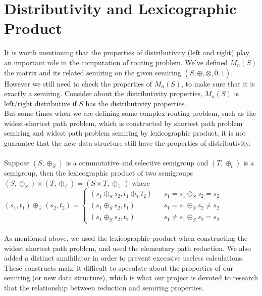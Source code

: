 \documentclass[a4paper,12pt,twoside,openright]{report}
\begin{document}
\section{Distributivity and Lexicographic Product}
It is worth mentioning that the properties of distributivity (left and right) play an important role in the computation of routing problem.
We've defined $M_n(S)$ the matrix and its related semiring on the given semiring $(S,\oplus,\otimes,\bar0,\bar1)$.
However we still need to check the properties of $M_n(S)$, to make sure that it is exactly a semiring.
Consider about the distributivity properties, $M_n(S)$ is left/right distributive if $S$ has the distributivity properties.\\
But some times when we are defining some complex routing problem, such as the widest-shortest path problem, which is constructed by shortest path problem semiring and widest path problem semiring by lexicographic product, it is not guarantee that the new data structure still have the properties of distributivity.\\\\
Suppose $(S,\oplus_S)$ is a commutative and selective semigroup and $(T,\oplus_t)$ is a semigroup, then the lexicographic product of two semigroups $(S,\oplus_S) \bar{\times} (T,\oplus_T) = (S\times T, \oplus_{\bar{\times}})$ where\\
$(s_1,t_1) \oplus_{\bar{\times}} (s_2,t_2)=\left\{
\begin{array}{rcl}
(s_1\oplus_S s_2,t_1\oplus_T t_2)      &      & { s_1 = s_1 \oplus_S s_2 = s_2}\\
(s_1\oplus_S s_2,t_1)       &      & {s_1 = s_1 \oplus_S s_2 \neq s_2}\\
(s_1\oplus_S s_2,t_2)       &      & {s_1 \neq s_1 \oplus_S s_2 = s_2}
\end{array} \right.$\\\\

As mentioned above, we used the lexicographic product when constructing the widest shortest path problem, and used the elementary path reduction. We also added a distinct annihilator in order to prevent excessive useless calculations. \\
These constructs make it difficult to speculate about the properties of our semiring (or new data structure), which is what our project is devoted to research that the relationship between reduction and semiring properties.
\end{document}
